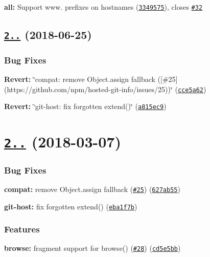 \begin{DoxyItemize}
\item {\bfseries all\+:} Support www. prefixes on hostnames (\href{https://github.com/npm/hosted-git-info/commit/3349575}{\tt 3349575}), closes \href{https://github.com/npm/hosted-git-info/issues/32}{\tt \#32}
\end{DoxyItemize}

\label{_2.6.1}%
 \subsection*{\href{https://github.com/npm/hosted-git-info/compare/v2.6.0...v2.6.1}{\tt 2..} (2018-\/06-\/25)}

\subsubsection*{Bug Fixes}


\begin{DoxyItemize}
\item {\bfseries Revert\+:} \char`\"{}compat\+: remove Object.\+assign fallback (\mbox{[}\#25\mbox{]}(https\+://github.\+com/npm/hosted-\/git-\/info/issues/25))\char`\"{} (\href{https://github.com/npm/hosted-git-info/commit/cce5a62}{\tt cce5a62})
\item {\bfseries Revert\+:} \char`\"{}git-\/host\+: fix forgotten extend()\char`\"{} (\href{https://github.com/npm/hosted-git-info/commit/a815ec9}{\tt a815ec9})
\end{DoxyItemize}

\label{_2.6.0}%
 \section*{\href{https://github.com/npm/hosted-git-info/compare/v2.5.0...v2.6.0}{\tt 2..} (2018-\/03-\/07)}

\subsubsection*{Bug Fixes}


\begin{DoxyItemize}
\item {\bfseries compat\+:} remove Object.\+assign fallback (\href{https://github.com/npm/hosted-git-info/issues/25}{\tt \#25}) (\href{https://github.com/npm/hosted-git-info/commit/627ab55}{\tt 627ab55})
\item {\bfseries git-\/host\+:} fix forgotten extend() (\href{https://github.com/npm/hosted-git-info/commit/eba1f7b}{\tt eba1f7b})
\end{DoxyItemize}

\subsubsection*{Features}


\begin{DoxyItemize}
\item {\bfseries browse\+:} fragment support for browse() (\href{https://github.com/npm/hosted-git-info/issues/28}{\tt \#28}) (\href{https://github.com/npm/hosted-git-info/commit/cd5e5bb}{\tt cd5e5bb}) 
\end{DoxyItemize}